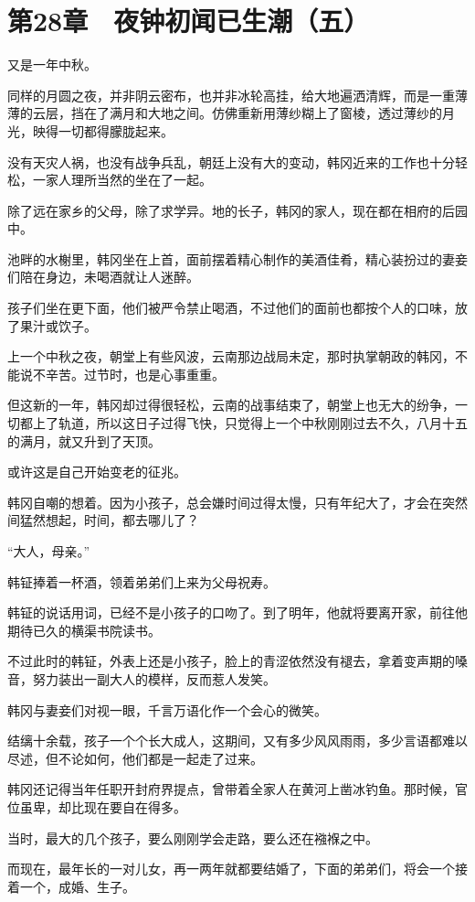 \section{第28章　夜钟初闻已生潮（五）}

又是一年中秋。

同样的月圆之夜，并非阴云密布，也并非冰轮高挂，给大地遍洒清辉，而是一重薄薄的云层，挡在了满月和大地之间。仿佛重新用薄纱糊上了窗棱，透过薄纱的月光，映得一切都得朦胧起来。

没有天灾人祸，也没有战争兵乱，朝廷上没有大的变动，韩冈近来的工作也十分轻松，一家人理所当然的坐在了一起。

除了远在家乡的父母，除了求学异。地的长子，韩冈的家人，现在都在相府的后园中。

池畔的水榭里，韩冈坐在上首，面前摆着精心制作的美酒佳肴，精心装扮过的妻妾们陪在身边，未喝酒就让人迷醉。

孩子们坐在更下面，他们被严令禁止喝酒，不过他们的面前也都按个人的口味，放了果汁或饮子。

上一个中秋之夜，朝堂上有些风波，云南那边战局未定，那时执掌朝政的韩冈，不能说不辛苦。过节时，也是心事重重。

但这新的一年，韩冈却过得很轻松，云南的战事结束了，朝堂上也无大的纷争，一切都上了轨道，所以这日子过得飞快，只觉得上一个中秋刚刚过去不久，八月十五的满月，就又升到了天顶。

或许这是自己开始变老的征兆。

韩冈自嘲的想着。因为小孩子，总会嫌时间过得太慢，只有年纪大了，才会在突然间猛然想起，时间，都去哪儿了？

“大人，母亲。”

韩钲捧着一杯酒，领着弟弟们上来为父母祝寿。

韩钲的说话用词，已经不是小孩子的口吻了。到了明年，他就将要离开家，前往他期待已久的横渠书院读书。

不过此时的韩钲，外表上还是小孩子，脸上的青涩依然没有褪去，拿着变声期的嗓音，努力装出一副大人的模样，反而惹人发笑。

韩冈与妻妾们对视一眼，千言万语化作一个会心的微笑。

结缡十余载，孩子一个个长大成人，这期间，又有多少风风雨雨，多少言语都难以尽述，但不论如何，他们都是一起走了过来。

韩冈还记得当年任职开封府界提点，曾带着全家人在黄河上凿冰钓鱼。那时候，官位虽卑，却比现在要自在得多。

当时，最大的几个孩子，要么刚刚学会走路，要么还在襁褓之中。

而现在，最年长的一对儿女，再一两年就都要结婚了，下面的弟弟们，将会一个接着一个，成婚、生子。

